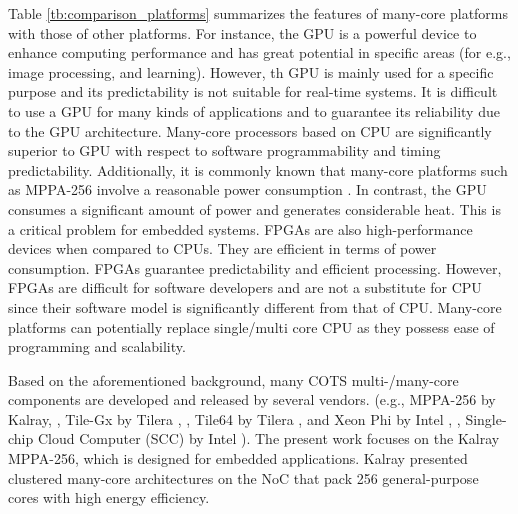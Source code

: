   Table \ref{tb:comparison_platforms} summarizes the features of many-core platforms with those of other platforms.
  For instance, the GPU is a powerful device to enhance computing performance and has great potential in specific areas (for e.g., image processing, and learning).
  However, th GPU is mainly used for a specific purpose and its predictability is not suitable for real-time systems.
  It is difficult to use a GPU for many kinds of applications and to guarantee its reliability due to the GPU architecture.
  Many-core processors based on CPU are significantly superior to GPU with respect to software programmability and timing predictability.
  Additionally, it is commonly known that many-core platforms such as MPPA-256 involve a reasonable power consumption \cite{kanter2015kalray}.
  In contrast, the GPU consumes a significant amount of power and generates considerable heat.
  This is a critical problem for embedded systems.
  FPGAs are also high-performance devices when compared to CPUs.
  They are efficient in terms of power consumption.
  FPGAs guarantee predictability and efficient processing.
  However, FPGAs are difficult for software developers and are not a substitute for CPU since their software model is significantly different from that of CPU.
  Many-core platforms can potentially replace single/multi core CPU as they possess ease of programming and scalability.
  
  Based on the aforementioned background, many COTS multi-/many-core components are developed and released by several vendors.
  (e.g., MPPA-256 by Kalray, \cite{de2014time}, Tile-Gx by Tilera \cite{ramey2011tile}, \cite{schooler2010tile}, Tile64 by Tilera \cite{bell2008tile64}, and Xeon Phi by Intel \cite{chrysos2014intel}, \cite{chrysos2012intel}, Single-chip Cloud Computer (SCC) by Intel \cite{baron2010single}).
  The present work focuses on the Kalray MPPA-256, which is designed for embedded applications.
  Kalray \cite{de2014time} presented clustered many-core architectures on the NoC that pack 256 general-purpose cores with high energy efficiency.
  
